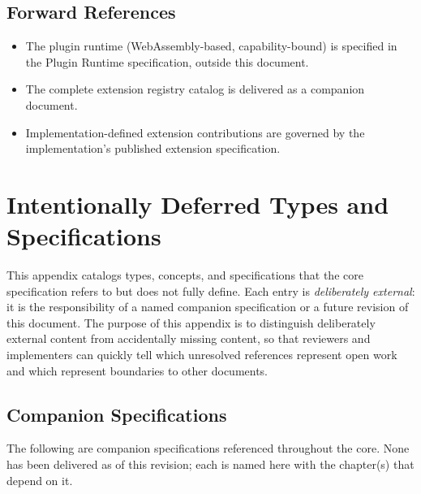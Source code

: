 \documentclass[11pt,letterpaper]{report}
\begin{document}
\section{Forward References}

\begin{itemize}
  \item The plugin runtime (WebAssembly-based, capability-bound)
    is specified in the Plugin Runtime specification, outside this
    document.
  \item The complete extension registry catalog is delivered as a
    companion document.
  \item Implementation-defined extension contributions are governed
    by the implementation's published extension specification.
\end{itemize}

\appendix

\chapter{Intentionally Deferred Types and Specifications}
\label{app:deferred}

This appendix catalogs types, concepts, and specifications that
the core specification refers to but does not fully define. Each
entry is \emph{deliberately external}: it is the responsibility
of a named companion specification or a future revision of this
document. The purpose of this appendix is to distinguish
deliberately external content from accidentally missing content,
so that reviewers and implementers can quickly tell which
unresolved references represent open work and which represent
boundaries to other documents.

\section{Companion Specifications}
\label{sec:deferred:companions}

The following are companion specifications referenced throughout
the core. None has been delivered as of this revision; each is
named here with the chapter(s) that depend on it.
\end{document}
